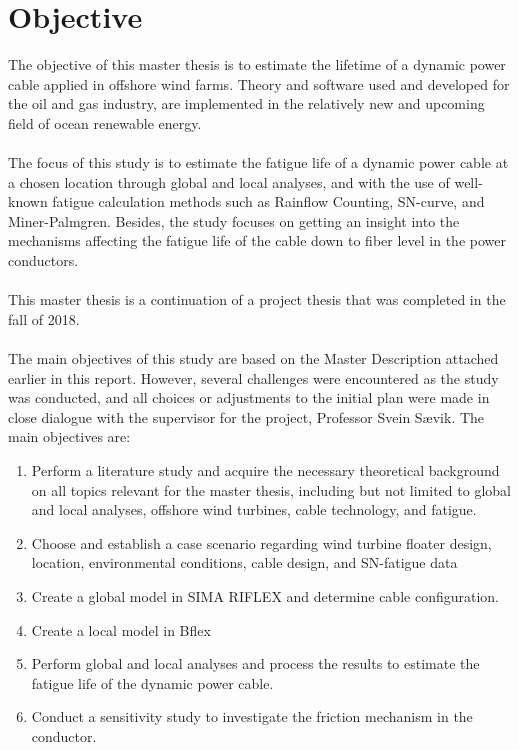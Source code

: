 \section{Objective}
The objective of this master thesis is to estimate the lifetime of a dynamic power cable applied in offshore wind farms.  Theory and software used and developed for the oil and gas industry, are implemented in the relatively new and upcoming field of ocean renewable energy.\\\\
The focus of this study is to estimate the fatigue life of a dynamic power cable at a chosen location through global and local analyses, and with the use of well-known fatigue calculation methods such as Rainflow Counting, SN-curve, and Miner-Palmgren.  Besides, the study focuses on getting an insight into the mechanisms affecting the fatigue life of the cable down to fiber level in the power conductors. \\\\
This master thesis is a continuation of a project thesis that was completed in the fall of 2018.\\\\
The main objectives of this study are based on the Master Description attached earlier in this report. However,  several challenges were encountered as the study was conducted, and all choices or adjustments to the initial plan were made in close dialogue with the supervisor for the project, Professor Svein Sævik. The main objectives are:
\begin{enumerate}
    \item Perform a literature study and acquire the necessary theoretical background on all topics relevant for the master thesis, including but not limited to global and local analyses, offshore wind turbines, cable technology, and fatigue.
    \item Choose and establish a case scenario regarding wind turbine floater design, location, environmental conditions, cable design, and SN-fatigue data
    \item Create a global model in SIMA RIFLEX and determine cable configuration. 
    \item Create a local model in Bflex
    \item Perform global and local analyses and process the results to estimate the fatigue life of the dynamic power cable.
    \item Conduct a sensitivity study to investigate the friction mechanism in the conductor.  
\end{enumerate} 

